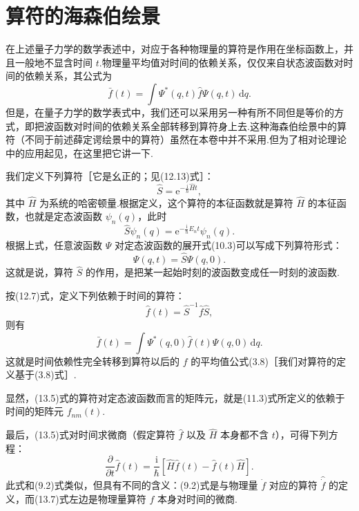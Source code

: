 \section{算符的海森伯绘景}

在上述量子力学的数学表述中，对应于各种物理量的算符是作用在坐标函数上，并且一般地不显含时间 $t$.物理量平均值对时间的依赖关系，仅仅来自状态波函数对时间的依赖关系，其公式为
\begin{equation}
  \bar{f}(t)=\int\varPsi^{*}(q,t)\hat{f}\varPsi(q,t)\,\mathrm{d}q.
\end{equation}
但是，在量子力学的数学表式中，我们还可以采用另一种有所不同但是等价的方式，即把波函数对时间的依赖关系全部转移到算符身上去.这种海森伯绘景中的算符（不同于前述薛定谔绘景中的算符）虽然在本卷中并不采用.但为了相对论理论中的应用起见，在这里把它讲一下.

我们定义下列算符［它是幺正的；见(12.13)式］：
\begin{equation}
  \hat{S}=\mathrm{e}^{-\frac{\mathrm{i}}{\hbar}\hat{H}t},
\end{equation}
其中 $\hat{H}$ 为系统的哈密顿量.根据定义，这个算符的本征函数就是算符 $\hat{H}$ 的本征函数，也就是定态波函数 $\psi_n(q)$，此时
\begin{equation}
  \hat{S}\psi_n(q)=\mathrm{e}^{-\frac{\mathrm{i}}{\hbar}E_nt}\psi_n(q).
\end{equation}
根据上式，任意波函数 $\varPsi$ 对定态波函数的展开式(10.3)可以写成下列算符形式：
\begin{equation}
  \varPsi(q,t)=\hat{S}\varPsi(q,0).
\end{equation}
这就是说，算符 $\hat{S}$ 的作用，是把某一起始时刻的波函数变成任一时刻的波函数.

按(12.7)式，定义下列依赖于时间的算符：
\begin{equation}
  \hat{f}(t)=\hat{S}^{-1}\hat{f}\hat{S},
\end{equation}
则有
\begin{equation}
  \bar{f}(t)=\int\varPsi^{*}(q,0)\hat{f}(t)\varPsi(q,0)\,\mathrm{d}q.
\end{equation}
这就是时间依赖性完全转移到算符以后的 $f$ 的平均值公式(3.8)［我们对算符的定义基于(3.8)式］.

显然，(13.5)式的算符对定态波函数而言的矩阵元，就是(11.3)式所定义的依赖于时间的矩阵元 $f_{nm}(t)$.

最后，(13.5)式对时间求微商（假定算符 $\hat{f}$ 以及 $\hat{H}$ 本身都不含 $t$），可得下列方程：
\begin{equation}
  \frac{\partial}{\partial t}\hat{f}(t)
  =\frac{\mathrm{i}}{\hbar}[\hat{H}\hat{f}(t)-\hat{f}(t)\hat{H}].
\end{equation}
此式和(9.2)式类似，但具有不同的含义：(9.2)式是与物理量 $\dot{f}$ 对应的算符 $\hat{\dot{f}}$ 的定义，而(13.7)式左边是物理量算符 $f$ 本身对时间的微商.

